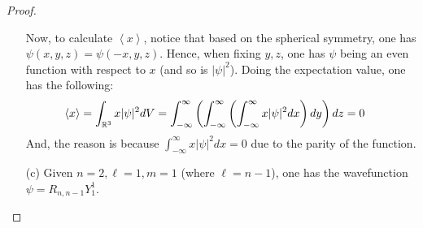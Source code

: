 \documentclass{article}
\begin{document}
\begin{proof}
\begin{itemize}
    Now, to calculate $\left<x\right>$, notice that based on the spherical symmetry, one has $\psi(x,y,z) = \psi(-x,y,z)$. Hence, when fixing $y,z$, one has $\psi$ being an even function with respect to $x$ (and so is $|\psi|^2$). Doing the expectation value, one has the following:
    \begin{align}
        \left<x\right> &= \int_{\RR^3}x|\psi|^2dV =  \int_{-\infty}^{\infty}\left(\int_{-\infty}^{\infty}\left(\int_{-\infty}^{\infty}x|\psi|^2 dx\right)dy\right)dz = 0
    \end{align}
    And, the reason is because $\int_{-\infty}^{\infty}x|\psi|^2dx = 0$ due to the parity of the function.

    \hfil

    \item[(c)] Given $n=2,\ell=1,m=1$ (where $\ell=n-1$), one has the wavefunction $\psi = R_{n,n-1}Y_1^1$. 
    

\end{itemize}
\end{proof}
\end{document}

